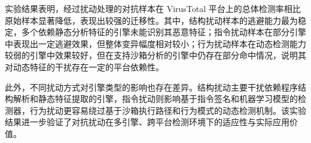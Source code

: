 
实验结果表明，经过扰动处理的对抗样本在 VirusTotal 平台上的总体检测率相比原始样本显著降低，表现出较强的迁移性。其中，结构扰动样本的逃避能力最为稳定，多个依赖静态分析特征的引擎未能识别其恶意特征；指令扰动样本在部分引擎中表现出一定逃避效果，但整体变异幅度相对较小；行为扰动样本在动态检测能力较弱的引擎中效果较好，但在支持沙箱分析的引擎中仍存在部分命中情况，说明其对动态特征的干扰存在一定的平台依赖性。


此外，不同扰动方式对引擎类型的影响也存在差异。结构扰动主要干扰依赖程序结构解析和静态特征提取的引擎，指令扰动则影响基于指令签名和机器学习模型的检测器，行为扰动更容易绕过基于沙箱执行路径和行为模式的动态检测机制。该实验结果进一步验证了对抗扰动在多引擎、跨平台检测环境下的适应性与实际应用价值。

